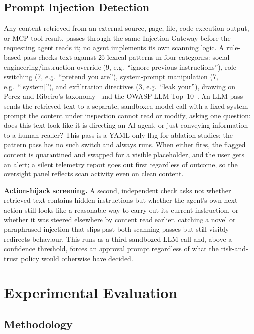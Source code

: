 \documentclass[a4paper, 11pt]{article}
\begin{document}
\subsection{Prompt Injection Detection}

Any content retrieved from an external source, page, file, code-execution output,
or MCP tool result, passes through the same Injection Gateway before the
requesting agent reads it; no agent implements its own scanning logic. A
rule-based pass checks text against 26 lexical patterns in four categories:
social-engineering/instruction override (9, e.g.\ ``ignore previous
instructions''), role-switching (7, e.g.\ ``pretend you are''), system-prompt
manipulation (7, e.g.\ ``{[system]}''), and exfiltration directives (3, e.g.\
``leak your''), drawing on Perez and Ribeiro's taxonomy~\cite{perez2022ignore}
and the OWASP LLM Top~10~\cite{owasp2025llm}. An LLM pass sends the retrieved
text to a separate, sandboxed model call with a fixed system prompt the content
under inspection cannot read or modify, asking one question: does this text look
like it is directing an AI agent, or just conveying information to a human
reader? This pass is a YAML-only flag for ablation studies; the pattern pass has
no such switch and always runs. When either fires, the flagged content is
quarantined and swapped for a visible placeholder, and the user gets an alert; a
silent telemetry report goes out first regardless of outcome, so the oversight
panel reflects scan activity even on clean content.

\textbf{Action-hijack screening.} A second, independent check asks not whether
retrieved text contains hidden instructions but whether the agent's own next
action still looks like a reasonable way to carry out its current instruction, or
whether it was steered elsewhere by content read earlier, catching a novel or
paraphrased injection that slips past both scanning passes but still visibly
redirects behaviour. This runs as a third sandboxed LLM call and, above a
confidence threshold, forces an approval prompt regardless of what the
risk-and-trust policy would otherwise have decided.

\section{Experimental Evaluation}
\label{sec:eval}

\subsection{Methodology}
\end{document}
